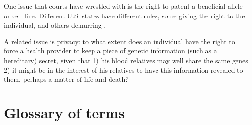 \documentclass{article}
\begin{document}
One issue that courts have wrestled with is the right to patent a beneficial allele or cell line. Different U.S. states have different rules, some giving the right to the individual, and others demurring \cite{john-moore-who-owns-your-genetic-information}.

A related issue is  privacy: to what extent does an individual have the right to force a health provider to keep a piece of genetic information (such as a hereditary) secret, given that 1) his blood relatives may well share the same genes 2) it might be in the interest of his relatives to have this information revealed to them, perhaps a matter of life and death?


\section{Glossary of terms}


\end{document}
